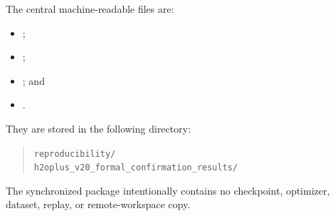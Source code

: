 The central machine-readable files are:
\begin{itemize}[leftmargin=*,nosep]
    \item {};
    \item {};
    \item {}; and
    \item {}.
\end{itemize}
\begin{samepage}
They are stored in the following directory:
\begin{quote}
\small
\texttt{reproducibility/}\\
\texttt{h2oplus\_v20\_formal\_confirmation\_results/}
\end{quote}
The synchronized package intentionally contains no checkpoint, optimizer,
dataset, replay, or remote-workspace copy.
\end{samepage}
